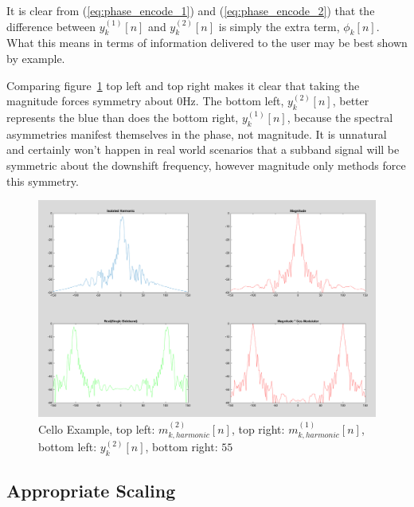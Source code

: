 \documentclass [11pt, proquest,oneside] {ganter_thesis}[2015/03/03]
\begin{document}
It is clear from (\ref{eq:phase_encode_1}) and (\ref{eq:phase_encode_2}) that the difference between $y_k^{(1)}[n]$ and $y_k^{(2)}[n]$ is simply the extra term, $\phi_k[n]$.  What this means in terms of information delivered to the user may be best shown by example.

Comparing figure~\ref{fig:real_vs_magnitude_example} top left and top right makes it clear that taking the magnitude forces symmetry about $0$Hz.  The bottom left, $y_k^{(2)}[n]$, better represents the blue than does the bottom right, $y_k^{(1)}[n]$, because the spectral asymmetries manifest themselves in the phase, not magnitude.  It is unnatural and certainly won't happen in real world scenarios that a subband signal will be symmetric about the downshift frequency, however magnitude only methods force this symmetry.

\begin{figure}[!ht]
  \centering
    \includegraphics[width=1\textwidth]{real_vs_magnitude_example}   
    \caption{Cello Example, top left: $m^{(2)}_{k,harmonic}[n]$, top right: $m^{(1)}_{k,harmonic}[n]$, bottom left: $y^{(2)}_k[n]$, bottom right: $55$}\label{fig:real_vs_magnitude_example}
\end{figure}


\subsection{Appropriate Scaling}
\end{document}
